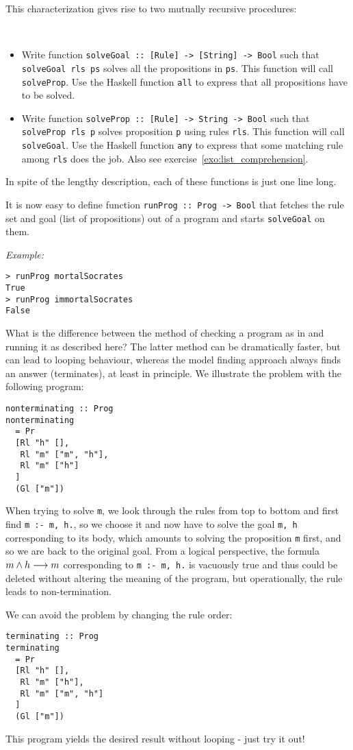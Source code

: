 \documentclass[english]{article}
\begin{document}
This characterization gives rise to two mutually recursive procedures:

\begin{exo}\label{sec:solve_prolog} \
  \begin{itemize}
  \item Write function \texttt{solveGoal :: [Rule] -> [String] -> Bool} such
    that \texttt{solveGoal rls ps} solves all the propositions in
    \texttt{ps}. This function will call \texttt{solveProp}. Use the Haskell
    function \texttt{all} to express that all propositions have to be solved.
  \item Write function \texttt{solveProp :: [Rule] -> String -> Bool} such
    that \texttt{solveProp rls p} solves proposition \texttt{p} using rules
    \texttt{rls}. This function will call \texttt{solveGoal}. Use the Haskell
    function \texttt{any} to express that some matching rule among
    \texttt{rls} does the job. Also see exercise~\ref{exo:list_comprehension}.
  \end{itemize}
  In spite of the lengthy description, each of these functions is just one
  line long.
\end{exo}


\begin{exo}\label{sec:runProg}
It is now easy to define function \texttt{runProg :: Prog -> Bool} that
fetches the rule set and goal (list of propositions) out of a program and
starts \texttt{solveGoal} on them.

\noindent
\emph{Example:}
\begin{lstlisting}
> runProg mortalSocrates
True
> runProg immortalSocrates
False
\end{lstlisting}
\end{exo}


What is the difference between the method of checking a program as in
\secref{sec:prolog_as_formula} and running it as described here? The latter
method can be dramatically faster, but can lead to looping behaviour, whereas
the model finding approach always finds an answer (terminates), at least in
principle. We illustrate the problem with the following program:

\begin{lstlisting}
nonterminating :: Prog
nonterminating
  = Pr
  [Rl "h" [],
   Rl "m" ["m", "h"],
   Rl "m" ["h"]
  ]
  (Gl ["m"])
\end{lstlisting}
When trying to solve \texttt{m}, we look through the rules from top to
bottom and first find \texttt{m :- m, h.}, so we choose it and now have to
solve the goal \texttt{m, h} corresponding to its body, which amounts to
solving the proposition \texttt{m} first, and so we are back to the original
goal. From a logical perspective, the formula $m \land h \longrightarrow m$ corresponding
to \texttt{m :- m, h.} is vacuously true and thus could be deleted without
altering the meaning of the program, but operationally, the rule leads to
non-termination.

We can avoid the problem by changing the rule order:
\begin{lstlisting}
terminating :: Prog
terminating
  = Pr
  [Rl "h" [],
   Rl "m" ["h"],
   Rl "m" ["m", "h"]
  ]
  (Gl ["m"])
\end{lstlisting}
This program yields the desired result without looping - just try it out!
\end{document}
